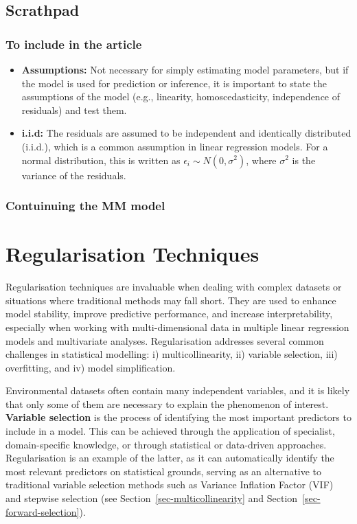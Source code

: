 \documentclass[
  letterpaper,
]{book}
\providecommand{\tightlist}{%
  \setlength{\itemsep}{0pt}\setlength{\parskip}{0pt}}\usepackage{longtable,booktabs,array}
\begin{document}
\section{Scrathpad}\label{scrathpad}

\subsection{To include in the article}\label{to-include-in-the-article}

\begin{itemize}
\tightlist
\item
  \textbf{Assumptions:} Not necessary for simply estimating model
  parameters, but if the model is used for prediction or inference, it
  is important to state the assumptions of the model (e.g., linearity,
  homoscedasticity, independence of residuals) and test them.
\item
  \textbf{i.i.d:} The residuals are assumed to be independent and
  identically distributed (i.i.d.), which is a common assumption in
  linear regression models. For a normal distribution, this is written
  as \(\epsilon_i \sim N(0, \sigma^2)\), where \(\sigma^2\) is the
  variance of the residuals.
\end{itemize}

\subsection{Contuinuing the MM model}\label{contuinuing-the-mm-model}

\chapter{Regularisation Techniques}\label{sec-regularisation}

Regularisation techniques are invaluable when dealing with complex
datasets or situations where traditional methods may fall short. They
are used to enhance model stability, improve predictive performance, and
increase interpretability, especially when working with
multi-dimensional data in multiple linear regression models and
multivariate analyses. Regularisation addresses several common
challenges in statistical modelling: i) multicollinearity, ii) variable
selection, iii) overfitting, and iv) model simplification.

Environmental datasets often contain many independent variables, and it
is likely that only some of them are necessary to explain the phenomenon
of interest. \textbf{Variable selection} is the process of identifying
the most important predictors to include in a model. This can be
achieved through the application of specialist, domain-specific
knowledge, or through statistical or data-driven approaches.
Regularisation is an example of the latter, as it can automatically
identify the most relevant predictors on statistical grounds, serving as
an alternative to traditional variable selection methods such as
Variance Inflation Factor (VIF) and stepwise selection (see
Section~\ref{sec-multicollinearity} and
Section~\ref{sec-forward-selection}).
\end{document}
